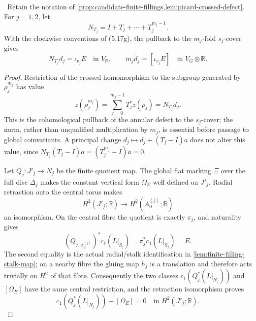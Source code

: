 \begin{lemma}
\label{lem:picard-finite-norm}
\Verified\ Retain the notation of
\cref{prop:candidate-finite-fillings,lem:picard-crossed-defect}.  For
$j=1,2$, let
\[
 N_{T_j}=I+T_j+\cdots+T_j^{m_j-1}.
\]
With the clockwise conventions of (5.17g), the pullback to the
$m_j$-fold $s_j$-cover gives
\[
 N_{T_j}d_j=\iota_{v_j}E
 \quad\text{in }V_{\mathbb R},
\qquad
 m_j\bar d_j=[\iota_{v_j}E]
 \quad\text{in }V_G\otimes\mathbb R.
\tag{5.17k}
\]
\end{lemma}

\begin{proof}
Restriction of the crossed homomorphism to the subgroup generated by
$\rho_j^{m_j}$ has value
\[
 z(\rho_j^{m_j})
 =\sum_{r=0}^{m_j-1}T_j^rz(\rho_j)=N_{T_j}d_j.
\tag{5.17l}
\]
This is the cohomological pullback of the annular defect to the
$s_j$-cover; the norm, rather than unqualified multiplication by $m_j$, is
essential before passage to global coinvariants.  A principal change
$d_j\mapsto d_j+(T_j-I)a$ does not alter this value, since
$N_{T_j}(T_j-I)a=(T_j^{m_j}-I)a=0$.

Let $Q_j:J'_j\to N_j$ be the finite quotient map.  The global flat marking
$\Xi$ over the full disc $\Delta_j$ makes the constant vertical form
$\Omega_E$ well defined on $J'_j$.  Radial retraction onto the central
torus makes
\[
 H^2(J'_j;\mathbb R)\longrightarrow H^2(A_0^{(j)};\mathbb R)
\]
an isomorphism.  On the central fibre the quotient is exactly $\pi_j$, and
naturality gives
\[
 (Q_j|_{A_0^{(j)}})^*c_1(L|_{S_j})
 =\pi_j^*c_1(L|_{S_j})=E.
\tag{5.17l'}
\]
The second equality is the actual radial/stalk identification in
\cref{lem:finite-filling-stalk-map}; on a nearby fibre the gluing map $h_j$
is a translation and therefore acts trivially on $H^2$ of that fibre.
Consequently the two classes
$c_1(Q_j^*(L|_{N_j}))$ and $[\Omega_E]$ have the same central restriction,
and the retraction isomorphism proves
\[
 c_1(Q_j^*(L|_{N_j}))-[\Omega_E]=0
 \quad\text{in }H^2(J'_j;\mathbb R).
\tag{5.17l''}
\]


\end{proof}
